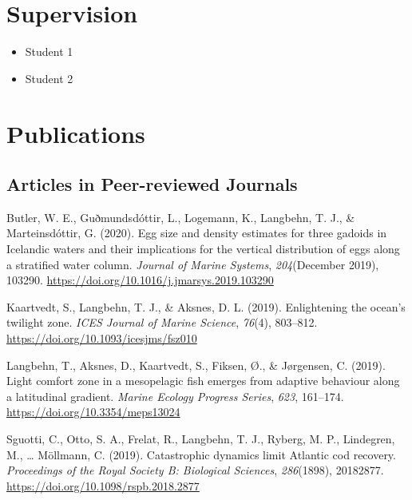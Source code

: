 \documentclass[11pt, a4paper]{awesome-cv}
\providecommand{\tightlist}{%
	\setlength{\itemsep}{0pt}\setlength{\parskip}{0pt}}
\begin{document}
\hypertarget{supervision}{%
\section{Supervision}\label{supervision}}

\begin{itemize}
\tightlist
\item
  Student 1
\item
  Student 2
\end{itemize}

\hypertarget{publications}{%
\section{Publications}\label{publications}}

\hypertarget{articles-in-peer-reviewed-journals}{%
\subsection{Articles in Peer-reviewed
Journals}\label{articles-in-peer-reviewed-journals}}

\hypertarget{refs_journals}{}
\leavevmode\hypertarget{ref-Butler2020}{}%
Butler, W. E., Guðmundsdóttir, L., Logemann, K., Langbehn, T. J., \&
Marteinsdóttir, G. (2020). Egg size and density estimates for three
gadoids in Icelandic waters and their implications for the vertical
distribution of eggs along a stratified water column. \emph{Journal of
Marine Systems}, \emph{204}(December 2019), 103290.
\url{https://doi.org/10.1016/j.jmarsys.2019.103290}

\leavevmode\hypertarget{ref-Kaartvedt2019b}{}%
Kaartvedt, S., Langbehn, T. J., \& Aksnes, D. L. (2019). Enlightening
the ocean's twilight zone. \emph{ICES Journal of Marine Science},
\emph{76}(4), 803--812. \url{https://doi.org/10.1093/icesjms/fsz010}

\leavevmode\hypertarget{ref-Langbehn2019a}{}%
Langbehn, T., Aksnes, D., Kaartvedt, S., Fiksen, Ø., \& Jørgensen, C.
(2019). Light comfort zone in a mesopelagic fish emerges from adaptive
behaviour along a latitudinal gradient. \emph{Marine Ecology Progress
Series}, \emph{623}, 161--174. \url{https://doi.org/10.3354/meps13024}

\leavevmode\hypertarget{ref-Sguotti}{}%
Sguotti, C., Otto, S. A., Frelat, R., Langbehn, T. J., Ryberg, M. P.,
Lindegren, M., \ldots{} Möllmann, C. (2019). Catastrophic dynamics limit
Atlantic cod recovery. \emph{Proceedings of the Royal Society B:
Biological Sciences}, \emph{286}(1898), 20182877.
\url{https://doi.org/10.1098/rspb.2018.2877}
\end{document}
